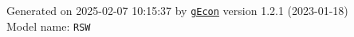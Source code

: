 \documentclass[10pt,a4paper]{article}
\numberwithin{equation}{section}
\begin{document}
\begin{landscape}
\begin{flushleft}{\large
Generated  on 2025-02-07 10:15:37 by \href{http://gecon.r-forge.r-project.org/}{\texttt{gEcon}} version 1.2.1 (2023-01-18)\\
Model name: \verb+RSW+
}\end{flushleft}


\end{landscape}

\end{document}

